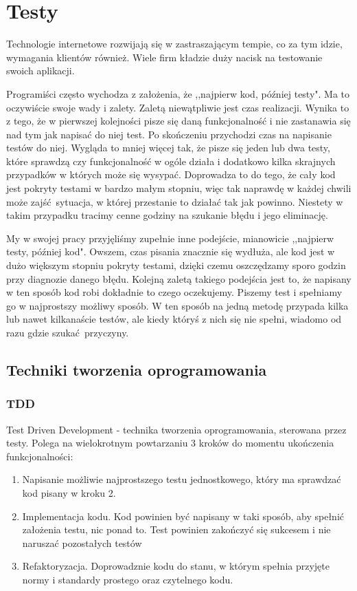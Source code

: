 \section{Testy}
	\label{testy}
    Technologie internetowe rozwijają się w zastraszającym tempie, co za tym idzie, wymagania klientów również. Wiele firm kładzie duży nacisk na testowanie swoich aplikacji.

  	Programiści często wychodza z założenia, że ,,najpierw kod, później testy". Ma to oczywiście swoje wady i zalety. Zaletą niewątpliwie jest czas realizacji. Wynika to z tego, że w pierwszej kolejności pisze się daną funkcjonalność i nie zastanawia się nad tym jak napisać do niej test. Po skończeniu przychodzi czas na napisanie testów do niej. Wygląda to mniej więcej tak, że pisze się jeden lub dwa testy, które sprawdzą czy funkcjonalność w ogóle działa i dodatkowo kilka skrajnych przypadków w których może się wysypać. Doprowadza to do tego, że cały kod jest pokryty testami w bardzo małym stopniu, więc tak naprawdę w każdej chwili może zajść sytuacja, w której przestanie to działać tak jak powinno. Niestety w takim przypadku tracimy cenne godziny na szukanie błędu i jego eliminację.

  	My w swojej pracy przyjęliśmy zupełnie inne podejście, mianowicie ,,najpierw testy, później kod". Owszem, czas pisania znacznie się wydłuża, ale kod jest w dużo większym stopniu pokryty testami, dzięki czemu oszczędzamy sporo godzin przy diagnozie danego błędu. Kolejną zaletą takiego podejścia jest to, że napisany w ten sposób kod robi dokładnie to czego oczekujemy. Piszemy test i spełniamy go w najprostszy możliwy sposób. W ten sposób na jedną metodę przypada kilka lub nawet kilkanaście testów, ale kiedy któryś z nich się nie spełni, wiadomo od razu gdzie szukać przyczyny.

  \newpage

  \subsection{Techniki tworzenia oprogramowania}
    \subsubsection{TDD}
    Test Driven Development\cite{tdd} - technika tworzenia oprogramowania, sterowana przez testy. Polega na wielokrotnym powtarzaniu 3 kroków do momentu ukończenia funkcjonalności:
    \begin{enumerate}
      \item Napisanie możliwie najprostszego testu jednostkowego, który ma sprawdzać kod pisany w kroku 2.
      \item Implementacja kodu. Kod powinien być napisany w taki sposób, aby spełnić założenia testu, nic ponad to. Test powinien zakończyć się sukcesem i nie naruszać pozostałych testów
      \item Refaktoryzacja. Doprowadznie kodu do stanu, w którym spełnia przyjęte normy i standardy prostego oraz czytelnego kodu\cite{scs}.
    \end{enumerate}

